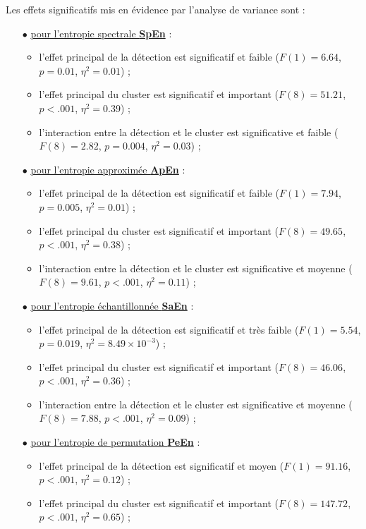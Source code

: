 Les effets significatifs mis en évidence par l'analyse de variance sont : 
\begin{itemize}
\item[$\bullet$] \underline{pour l'entropie spectrale \textbf{SpEn}} : 
\begin{itemize} 
\item l'effet principal de la détection est significatif et faible ($F(1)=6.64$, $p=0.01$, $\eta^2=0.01$) ; 
\item l'effet principal du cluster est significatif et important ($F(8)=51.21$, $p<.001$, $\eta^2=0.39$) ; 
\item l'interaction entre la détection et le cluster est significative et faible ($F(8)=2.82$, $p=0.004$, $\eta^2=0.03$) ;
\end{itemize}
\item[$\bullet$] \underline{pour l'entropie approximée \textbf{ApEn}} :
\begin{itemize} 
\item l'effet principal de la détection est significatif et faible ($F(1)=7.94$, $p=0.005$, $\eta^2=0.01$) ; 
\item l'effet principal du cluster est significatif et important ($F(8)=49.65$, $p<.001$, $\eta^2=0.38$) ; 
\item l'interaction entre la détection et le cluster est significative et moyenne ($F(8)=9.61$, $p<.001$, $\eta^2=0.11$) ; 
\end{itemize}
\item[$\bullet$] \underline{pour l'entropie échantillonnée \textbf{SaEn}} :
\begin{itemize} 
\item l'effet principal de la détection est significatif et très faible ($F(1)=5.54$, $p=0.019$, $\eta^2=8.49\times10^{-3}$) ; 
\item l'effet principal du cluster est significatif et important ($F(8)=46.06$, $p<.001$, $\eta^2=0.36$) ; 
\item l'interaction entre la détection et le cluster est significative et moyenne ($F(8)=7.88$, $p<.001$, $\eta^2=0.09$) ; 
\end{itemize}
\item[$\bullet$] \underline{pour l'entropie de permutation \textbf{PeEn}} :
\begin{itemize}
\item l'effet principal de la détection est significatif et moyen ($F(1)=91.16$, $p<.001$, $\eta^2=0.12$) ; 
\item l'effet principal du cluster est significatif et important ($F(8)=147.72$, $p<.001$, $\eta^2=0.65$) ; 

\end{itemize}
\end{itemize}
